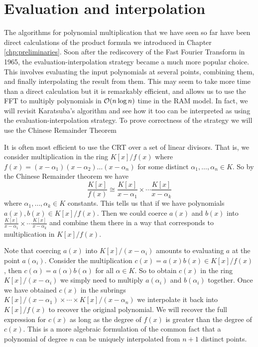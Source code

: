 \chapter{Evaluation and interpolation}\label{chp:eval-interp}

The algorithms for polynomial multiplication that we have seen so far have been direct calculations of the product formula we introduced in Chapter \ref{chp:preliminaries}. Soon after the rediscovery of the Fast Fourier Transform in 1965, the evaluation-interpolation strategy became a much more popular choice. This involves evaluating the input polynomials at several points, combining them, and finally interpolating the result from them. This may seem to take more time than a direct calculation but it is remarkably efficient, and allows us to use the FFT to multiply polynomials in $\mathcal O(n \log n)$ time in the RAM model. In fact, we will revisit Karatsuba's algorithm and see how it too can be interpreted as using the evaluation-interpolation strategy. To prove correctness of the strategy we will use the Chinese Remainder Theorem

It is often most efficient to use the CRT over a set of linear divisors. That is, we consider multiplication in the ring $K[x] / f(x)$ where $f(x) = (x - \alpha_1)(x - \alpha_2) \ldots (x - \alpha_n)$ for some distinct $\alpha_1, \ldots, \alpha_n \in K$. So by the Chinese Remainder theorem we have
\[
    \frac{K[x]}{f(x)} \cong \frac{K[x]}{x - \alpha_1} \times \cdots \frac{K[x]}{x - \alpha_k}
\]
where $\alpha_1, \ldots, \alpha_k \in K$ constants. This tells us that if we have polynomials $a(x), b(x) \in K[x] / f(x)$. Then we could coerce $a(x)$ and $b(x)$ into $\frac{K[x]}{x - \alpha_1} \times \cdots \frac{K[x]}{x - \alpha_k}$ and combine them there in a way that corresponds to multiplication in $K[x] / f(x)$.

\medskip

Note that coercing $a(x)$ into $K[x] / (x - \alpha_i)$ amounts to evaluating $a$ at the point $a(\alpha_i)$. Consider the multiplication $c(x) = a(x)b(x) \in K[x] / f(x)$, then $c(\alpha) = a(\alpha)b(\alpha)$ for all $\alpha \in K$. So to obtain $c(x)$ in the ring $K[x] / (x - \alpha_i)$ we simply need to multiply $a(\alpha_i)$ and $b(\alpha_i)$ together. Once we have obtained $c(x)$ in the subrings $K[x] / (x - \alpha_1) \times \cdots \times K[x] / (x - \alpha_n)$ we interpolate it back into $K[x]/ f(x)$ to recover the original polynomial. We will recover the full expression for $c(x)$ as long as the degree of $f(x)$ is greater than the degree of $c(x)$. This is a more algebraic formulation of the common fact that a polynomial of degree $n$ can be uniquely interpolated from $n + 1$ distinct points.

